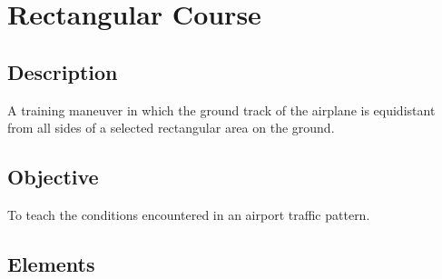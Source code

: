 \section{Rectangular Course}

\subsection{Description}

A training maneuver in which the ground track of the airplane is equidistant
from all sides of a selected rectangular area on the ground.

\subsection{Objective}

To teach the conditions encountered in an airport traffic pattern.

\subsection{Elements}

